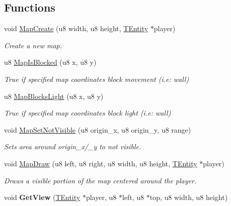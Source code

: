 \subsection*{Functions}
\begin{DoxyCompactItemize}
\item 
void \mbox{\hyperlink{group__GameMap_ga0a25d4a00a01f6a01f415c8cf22b17d2}{Map\+Create}} (u8 width, u8 height, \mbox{\hyperlink{structTEntity}{T\+Entity}} $\ast$player)
\begin{DoxyCompactList}\small\item\em Create a new map. \end{DoxyCompactList}\item 
u8 \mbox{\hyperlink{group__GameMap_ga3eae0d3c0cf7368023838ed2dfc5e3c8}{Map\+Is\+Blocked}} (u8 x, u8 y)
\begin{DoxyCompactList}\small\item\em True if specified map coordinates block movement (i.\+e\+: wall) \end{DoxyCompactList}\item 
\mbox{\label{group__GameMap_ga4a96cfd7d7f5dab759c0274d498ca927}} 
u8 \mbox{\hyperlink{group__GameMap_ga4a96cfd7d7f5dab759c0274d498ca927}{Map\+Blocks\+Light}} (u8 x, u8 y)
\begin{DoxyCompactList}\small\item\em True if specified map coordinates block light (i.\+e\+: wall) \end{DoxyCompactList}\item 
\mbox{\label{group__GameMap_ga806e9ea5321e82e566b161fcbd5e2e2d}} 
void \mbox{\hyperlink{group__GameMap_ga806e9ea5321e82e566b161fcbd5e2e2d}{Map\+Set\+Not\+Visible}} (u8 origin\+\_\+x, u8 origin\+\_\+y, u8 range)
\begin{DoxyCompactList}\small\item\em Sets area around origin\+\_\+x/\+\_\+y to not visible. \end{DoxyCompactList}\item 
void \mbox{\hyperlink{group__GameMap_ga300f688f7b1989dba73d6bae2772a7dc}{Map\+Draw}} (u8 left, u8 right, u8 width, u8 height, \mbox{\hyperlink{structTEntity}{T\+Entity}} $\ast$player)
\begin{DoxyCompactList}\small\item\em Draws a visible portion of the map centered around the player. \end{DoxyCompactList}\item 
\mbox{\label{group__GameMap_gae17467d65d599928e1b7bfa3ddeee49f}} 
void {\bfseries Get\+View} (\mbox{\hyperlink{structTEntity}{T\+Entity}} $\ast$player, u8 $\ast$left, u8 $\ast$top, u8 width, u8 height)
\end{DoxyCompactItemize}
